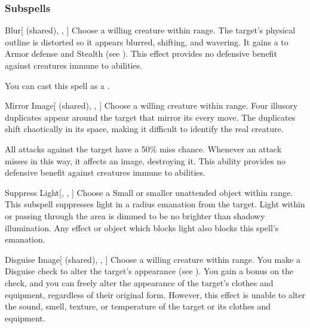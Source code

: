 \subsubsection{Subspells}


\begin{ability}[\nth{1}]{Blur}[ (shared), , ]
Choose a willing creature within \rngmed range.
The target's physical outline is distorted so it appears blurred, shifting, and wavering.
It gains a   to Armor defense and Stealth (see ).
This effect provides no defensive benefit against creatures immune to  abilities.

You can cast this spell as a .
\end{ability}
\vspace{0.25em}


\begin{ability}[\nth{2}]{Mirror Image}[ (shared), , ]
Choose a willing creature within \rngclose range.
Four illusory duplicates appear around the target that mirror its every move.
The duplicates shift chaotically in its space, making it difficult to identify the real creature.

All  attacks against the target have a 50\% miss chance.
Whenever an attack misses in this way, it affects an image, destroying it.
This ability provides no defensive benefit against creatures immune to  abilities.
\end{ability}
\vspace{0.25em}


\begin{ability}[\nth{2}]{Suppress Light}[, , ]
Choose a Small or smaller unattended object within \rngclose range.
This subspell suppresses light in a \areamed radius emanation from the target.
Light within or passing through the area is dimmed to be no brighter than shadowy illumination.
Any effect or object which blocks light also blocks this spell's emanation.
\end{ability}
\vspace{0.25em}


\begin{ability}[\nth{3}]{Disguise Image}[ (shared), , ]
Choose a willing creature within \rngclose range.
You make a Disguise check to alter the target's appearance (see ).
You gain a  bonus on the check, and you can freely alter the appearance of the target's clothes and equipment, regardless of their original form.
However, this effect is unable to alter the sound, smell, texture, or temperature of the target or its clothes and equipment.
\end{ability}
\vspace{0.25em}


